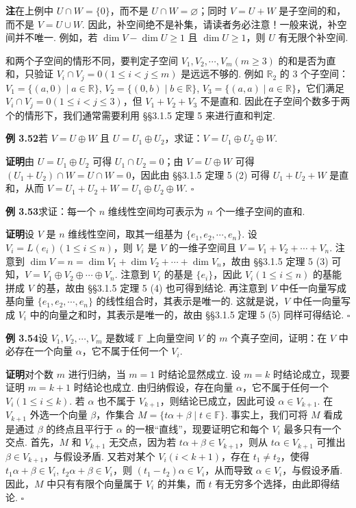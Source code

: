 \documentclass[UTF8,12pt,a4paper,fontset=fandol]{ctexart}
\begin{document}
\noindent\textbf{注}\quad 在上例中 $U\cap W=\{0\}$，而不是 $U\cap W=\varnothing$；同时 $V=U+W$ 是子空间的和，而不是 $V=U\cup W$. 因此，补空间绝不是补集，请读者务必注意！一般来说，补空间并不唯一. 例如，若 $\dim V-\dim U\ge 1$ 且 $\dim U\ge 1$，则 $U$ 有无限个补空间.

和两个子空间的情形不同，要判定子空间 $V_1,V_2,\cdots,V_m(m\ge 3)$ 的和是否为直和，只验证 $V_i\cap V_j=0(1\le i<j\le m)$ 是远远不够的. 例如 $\mathbb{R}_2$ 的 3 个子空间：$V_1=\{(a,0)\mid a\in\mathbb{R}\}$, $V_2=\{(0,b)\mid b\in\mathbb{R}\}$, $V_3=\{(a,a)\mid a\in\mathbb{R}\}$，它们满足 $V_i\cap V_j=0(1\le i<j\le 3)$，但 $V_1+V_2+V_3$ 不是直和. 因此在子空间个数多于两个的情形下，我们通常需要利用 §§3.1.5 定理 5 来进行直和判定.

\noindent\textbf{例 3.52}\quad 若 $V=U\oplus W$ 且 $U=U_1\oplus U_2$，求证：$V=U_1\oplus U_2\oplus W$.

\noindent\textbf{证明}\quad 由 $U=U_1\oplus U_2$ 可得 $U_1\cap U_2=0$；由 $V=U\oplus W$ 可得 $(U_1+U_2)\cap W=U\cap W=0$，因此由 §§3.1.5 定理 5 (2) 可得 $U_1+U_2+W$ 是直和，从而 $V=U_1+U_2+W=U_1\oplus U_2\oplus W$. $\square$

\noindent\textbf{例 3.53}\quad 求证：每一个 $n$ 维线性空间均可表示为 $n$ 个一维子空间的直和.

\noindent\textbf{证明}\quad 设 $V$ 是 $n$ 维线性空间，取其一组基为 $\{e_1,e_2,\cdots,e_n\}$. 设 $V_i=L(e_i)(1\le i\le n)$，则 $V_i$ 是 $V$ 的一维子空间且 $V=V_1+V_2+\cdots+V_n$. 注意到 $\dim V=n=\dim V_1+\dim V_2+\cdots+\dim V_n$，故由 §§3.1.5 定理 5 (3) 可知，$V=V_1\oplus V_2\oplus\cdots\oplus V_n$. 注意到 $V_i$ 的基是 $\{e_i\}$，因此 $V_i(1\le i\le n)$ 的基能拼成 $V$ 的基，故由 §§3.1.5 定理 5 (4) 也可得到结论. 再注意到 $V$ 中任一向量写成基向量 $\{e_1,e_2,\cdots,e_n\}$ 的线性组合时，其表示是唯一的. 这就是说，$V$ 中任一向量写成 $V_i$ 中的向量之和时，其表示是唯一的，故由 §§3.1.5 定理 5 (5) 同样可得结论. $\square$

\noindent\textbf{例 3.54}\quad 设 $V_1,V_2,\cdots,V_m$ 是数域 $\mathbb{F}$ 上向量空间 $V$ 的 $m$ 个真子空间，证明：在 $V$ 中必存在一个向量 $\alpha$，它不属于任何一个 $V_i$.

\noindent\textbf{证明}\quad 对个数 $m$ 进行归纳，当 $m=1$ 时结论显然成立. 设 $m=k$ 时结论成立，现要证明 $m=k+1$ 时结论也成立. 由归纳假设，存在向量 $\alpha$，它不属于任何一个 $V_i(1\le i\le k)$. 若 $\alpha$ 也不属于 $V_{k+1}$，则结论已成立，因此可设 $\alpha\in V_{k+1}$. 在 $V_{k+1}$ 外选一个向量 $\beta$，作集合 $M=\{t\alpha+\beta\mid t\in\mathbb{F}\}$. 事实上，我们可将 $M$ 看成是通过 $\beta$ 的终点且平行于 $\alpha$ 的一根“直线”，现要证明它和每个 $V_i$ 最多只有一个交点. 首先，$M$ 和 $V_{k+1}$ 无交点，因为若 $t\alpha+\beta\in V_{k+1}$，则从 $t\alpha\in V_{k+1}$ 可推出 $\beta\in V_{k+1}$，与假设矛盾. 又若对某个 $V_i(i<k+1)$，存在 $t_1\ne t_2$，使得 $t_1\alpha+\beta\in V_i$, $t_2\alpha+\beta\in V_i$，则 $(t_1-t_2)\alpha\in V_i$，从而导致 $\alpha\in V_i$，与假设矛盾. 因此，$M$ 中只有有限个向量属于 $V_i$ 的并集，而 $t$ 有无穷多个选择，由此即得结论. $\square$
\end{document}
